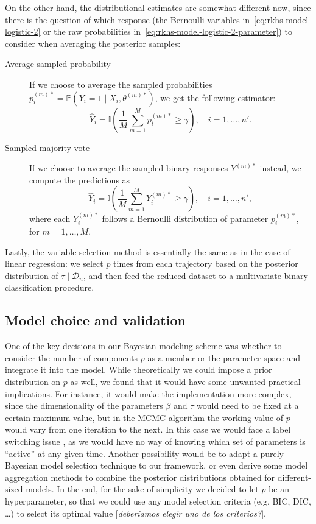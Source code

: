 \documentclass[ba]{imsart}
\numberwithin{equation}{section}
\theoremstyle{plain}
\newcommand\incomment[2][comment-red]{\color{#1}[\textit{#2}]\color{black}}
\begin{document}
On the other hand, the distributional estimates are somewhat different now, since there is the question of which response (the Bernoulli variables in~\eqref{eq:rkhs-model-logistic-2} or the raw probabilities in~\eqref{eq:rkhs-model-logistic-2-parameter}) to consider when averaging the posterior samples:
\begin{description}
  \item[Average sampled probability] If we choose to average the sampled probabilities \(p_i^{(m)*} = \mathbb P(Y_i =1 \mid X_i,\theta^{(m)*})\), we get the following estimator:
  \[
    \hat Y_i = \mathbb I\left(\frac{1}{M} \sum_{m=1}^M p_i^{(m)*} \geq \gamma\right), \quad i=1,\dots,n'.
  \]
  \item[Sampled majority vote] If we choose to average the sampled binary responses \(Y^{(m)*}\) instead, we compute the predictions as
\[
  \hat Y_i = \mathbb I\left(\frac{1}{M} \sum_{m=1}^M Y_i^{(m)*} \geq \gamma\right), \quad i=1,\dots,n',
\]
where each \(Y_i^{(m)*}\) follows a Bernoulli distribution of parameter \(p_i^{(m)*}\), for \(m=1,\dots,M\).
\end{description}

Lastly, the variable selection method is essentially the same as in the case of linear regression: we select \(p\) times from each trajectory based on the posterior distribution of \(\tau\mid \mathcal D_n\), and then feed the reduced dataset to a multivariate binary classification procedure.

\subsection{Model choice and validation}\label{sec:model-choice}

One of the key decisions in our Bayesian modeling scheme was whether to consider the number of components \(p\) as a member or the parameter space and integrate it into the model. While theoretically we could impose a prior distribution on \(p\) as well, we found that it would have some unwanted practical implications. For instance, it would make the implementation more complex, since the dimensionality of the parameters \(\beta\) and \(\tau\) would need to be fixed at a certain maximum value, but in the MCMC algorithm the working value of \(p\) would vary from one iteration to the next. In this case we would face a label switching issue \citep[c.f.][Sec.~2.3]{grollemund2019bayesian}, as we would have no way of knowing which set of parameters is ``active'' at any given time. Another possibility would be to adapt a purely Bayesian model selection technique \citep[see][Ch.~7]{piironen2017comparison, gelman1995bayesian} to our framework, or even derive some model aggregation methods to combine the posterior distributions obtained for different-sized models. In the end, for the sake of simplicity we decided to let \(p\) be an hyperparameter, so that we could use any model selection criteria (e.g. BIC, DIC, \ldots) to select its optimal value \incomment{deberíamos elegir uno de los criterios?}.
\end{document}
